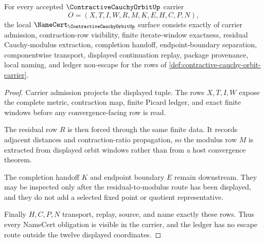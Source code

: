 \begin{theorem}
\label{thm:contractive-cauchy-orbit-namecert-obligations}
For every accepted $\ContractiveCauchyOrbitUp$ carrier
$$
O=(X,T,I,W,R,M,K,E,H,C,P,N),
$$
the local $\NameCert_{\ContractiveCauchyOrbitUp}$ surface consists exactly of carrier admission, contraction-row visibility, finite iterate-window exactness, residual Cauchy-modulus extraction, completion handoff, endpoint-boundary separation, componentwise transport, displayed continuation replay, package provenance, local naming, and ledger non-escape for the rows of \autoref{def:contractive-cauchy-orbit-carrier}.
\end{theorem}
\begin{proof}
Carrier admission projects the displayed tuple. The rows $X,T,I,W$ expose the complete metric, contraction map, finite Picard ledger, and exact finite windows before any convergence-facing row is read.

The residual row $R$ is then forced through the same finite data. It records adjacent distances and contraction-ratio propagation, so the modulus row $M$ is extracted from displayed orbit windows rather than from a host convergence theorem.

The completion handoff $K$ and endpoint boundary $E$ remain downstream. They may be inspected only after the residual-to-modulus route has been displayed, and they do not add a selected fixed point or quotient representative.

Finally $H,C,P,N$ transport, replay, source, and name exactly these rows. Thus every NameCert obligation is visible in the carrier, and the ledger has no escape route outside the twelve displayed coordinates.
\end{proof}


